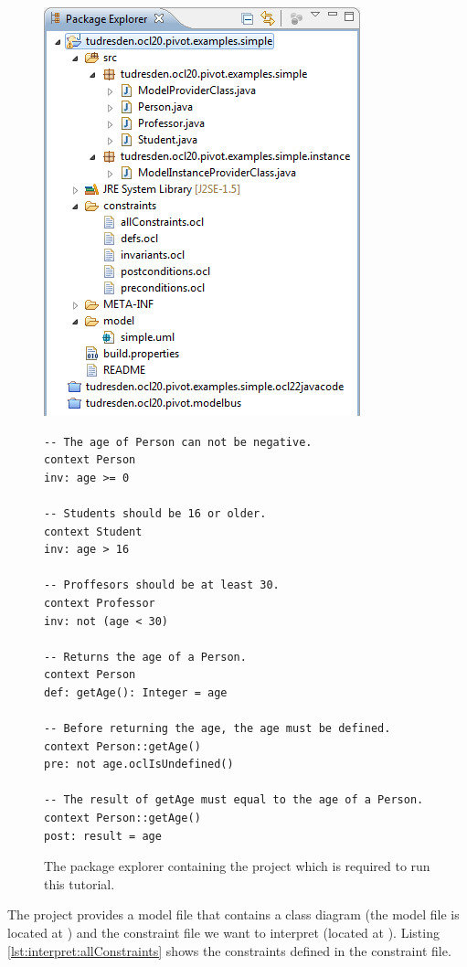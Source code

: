 \begin{figure}[!p]
	\centering
	\includegraphics[width=0.5\linewidth]{figures/examples/simple02}
	\caption{The package explorer containing the project which is required to run this tutorial.}
	\label{pic:example:simple02}
	
	\vspace{4.0em}

  \lstset{
    language=OCL
  }
  \begin{lstlisting}[caption={The constraints contained in the constraint file.}, captionpos=b, label=lst:interpret:allConstraints]
-- The age of Person can not be negative.
context Person
inv: age >= 0

-- Students should be 16 or older.
context Student
inv: age > 16

-- Proffesors should be at least 30.
context Professor
inv: not (age < 30)

-- Returns the age of a Person.
context Person
def: getAge(): Integer = age

-- Before returning the age, the age must be defined.
context Person::getAge()
pre: not age.oclIsUndefined()

-- The result of getAge must equal to the age of a Person.
context Person::getAge()
post: result = age
  \end{lstlisting}
\end{figure}

The project provides a model file that contains a class diagram (the model file is located at ) and the constraint file we want to interpret (located at ). Listing \ref{lst:interpret:allConstraints} shows the constraints defined in the constraint file.

